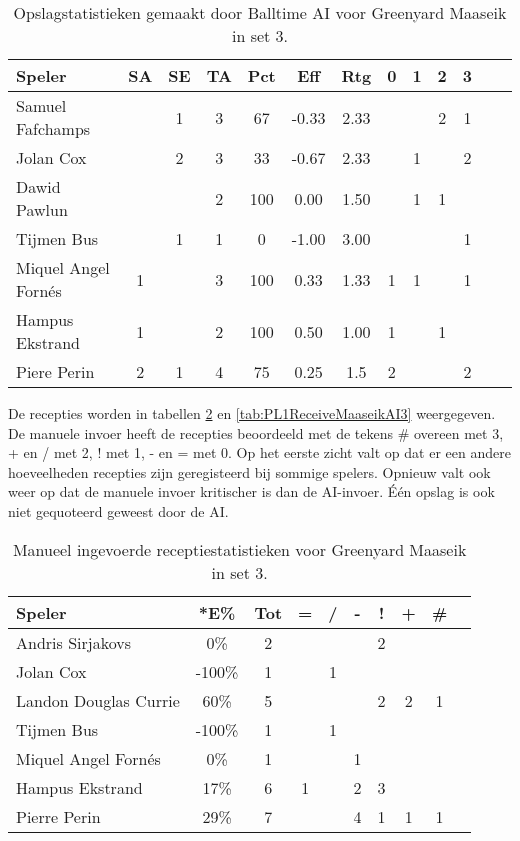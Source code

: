 \begin{table}[ht!]
  \centering
  \scriptsize
  \begin{tabular}{|l|c|c|c|c|c|c|c|c|c|c|c|c|} \hline
    \textbf{Speler} & SA & SE & TA & Pct & Eff & Rtg & 0 & 1 & 2 & 3  \\ \hline
    Samuel Fafchamps &  & 1 & 3 & 67 & -0.33 & 2.33 &   &   & 2 & 1 \\
    Jolan Cox &  & 2 & 3 & 33 & -0.67 & 2.33 &   & 1 &   & 2 \\
    Dawid Pawlun &  &  & 2 & 100 & 0.00 & 1.50 &   & 1 & 1 &  \\
    Tijmen Bus &  & 1 & 1 & 0 & -1.00 & 3.00 &   & &   &  1 \\
    Miquel Angel Fornés & 1 &  & 3 & 100 & 0.33 & 1.33 & 1 & 1 &   & 1 \\
    Hampus Ekstrand & 1 &  & 2 & 100 & 0.50 & 1.00 & 1 &   & 1 &  \\
    Piere Perin & 2 & 1 & 4 & 75 & 0.25 & 1.5 & 2 &   &   & 2 \\ \hline
  \end{tabular}
  \caption[Opslagstatistieken gemaakt door Balltime AI voor Greenyard Maaseik in set 3]{\label{tab:PL1ServeMaaseikAI3}Opslagstatistieken gemaakt door Balltime AI voor Greenyard Maaseik in set 3.}
\end{table}

De recepties worden in tabellen \ref{tab:PL1ReceiveMaaseikMan3} en \ref{tab:PL1ReceiveMaaseikAI3} weergegeven. De manuele invoer heeft de recepties beoordeeld met de tekens \# overeen met 3, + en / met 2, ! met 1, - en = met 0. Op het eerste zicht valt op dat er een andere hoeveelheden recepties zijn geregisteerd bij sommige spelers. Opnieuw valt ook weer op dat de manuele invoer kritischer is dan de AI-invoer. Één opslag is ook niet gequoteerd geweest door de AI.

\begin{table}[ht!]
  \centering
  \scriptsize
  \begin{tabular}{|l|c|c|c|c|c|c|c|c|c|}
    \hline
    \textbf{Speler}& *E\% & Tot & = & / & - & ! & + & \#\\ \hline
    Andris Sirjakovs & 0\% & 2 &  &  &  & 2 &  &  \\ 
    Jolan Cox & -100\% & 1 &  & 1 &  &  &  &  \\
    Landon Douglas Currie & 60\% & 5 &  &  &  & 2 & 2 & 1 \\
    Tijmen Bus & -100\% & 1 &  & 1 &  &  &  &  \\ 
    Miquel Angel Fornés & 0\% & 1 &  &  & 1 &  &  &  \\ 
    Hampus Ekstrand & 17\% & 6 & 1 &  & 2 & 3 &  &  \\ 
    Pierre Perin & 29\% & 7 &  &  & 4 & 1 & 1 & 1 \\ \hline
  \end{tabular}
  \caption[Manueel ingevoerde receptiestatistieken voor Greenyard Maaseik in set 3]{\label{tab:PL1ReceiveMaaseikMan3}Manueel ingevoerde receptiestatistieken voor Greenyard Maaseik in set 3.}
\end{table}

